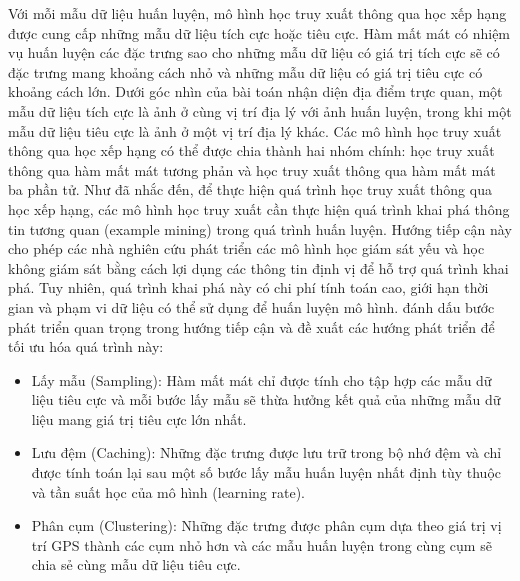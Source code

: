 Với mỗi mẫu dữ liệu huấn luyện, mô hình học truy xuất thông qua học xếp hạng được cung cấp những mẫu dữ liệu tích cực hoặc tiêu cực. Hàm mất mát có nhiệm vụ huấn luyện các đặc trưng sao cho những mẫu dữ liệu có giá trị tích cực sẽ có đặc trưng mang khoảng cách nhỏ và những mẫu dữ liệu có giá trị tiêu cực có khoảng cách lớn. Dưới góc nhìn của bài toán nhận diện địa điểm trực quan, một mẫu dữ liệu tích cực là ảnh ở cùng vị trí địa lý với ảnh huấn luyện, trong khi một mẫu dữ liệu tiêu cực là ảnh ở một vị trí địa lý khác. Các mô hình học truy xuất thông qua học xếp hạng có thể được chia thành hai nhóm chính: học truy xuất thông qua hàm mất mát tương phản và học truy xuất thông qua hàm mất mát ba phần tử. Như đã nhắc đến, để thực hiện quá trình học truy xuất thông qua học xếp hạng, các mô hình học truy xuất cần thực hiện quá trình khai phá thông tin tương quan (example mining) trong quá trình huấn luyện. Hướng tiếp cận này cho phép các nhà nghiên cứu phát triển các mô hình học giám sát yếu \cite{arandjelovic2016netvlad, jin2017learned} và học không giám sát \cite{radenovic2018fine} bằng cách lợi dụng các thông tin định vị để hỗ trợ quá trình khai phá. Tuy nhiên, quá trình khai phá này có chi phí tính toán cao, giới hạn thời gian và phạm vi dữ liệu có thể sử dụng để huấn luyện mô hình. \cite{arandjelovic2016netvlad} đánh dấu bước phát triển quan trọng trong hướng tiếp cận và đề xuất các hướng phát triển để tối ưu hóa quá trình này:

\begin{itemize}
    \item Lấy mẫu (Sampling): Hàm mất mát chỉ được tính cho tập hợp các mẫu dữ liệu tiêu cực và mỗi bước lấy mẫu sẽ thừa hưởng kết quả của những mẫu dữ liệu mang giá trị tiêu cực lớn nhất.
    \item Lưu đệm (Caching): Những đặc trưng được lưu trữ trong bộ nhớ đệm và chỉ được tính toán lại sau một số bước lấy mẫu huấn luyện nhất định tùy thuộc và tần suất học của mô hình (learning rate).
    \item Phân cụm (Clustering): Những đặc trưng được phân cụm dựa theo giá trị vị trí GPS thành các cụm nhỏ hơn và các mẫu huấn luyện trong cùng cụm sẽ chia sẻ cùng mẫu dữ liệu tiêu cực.
\end{itemize}
